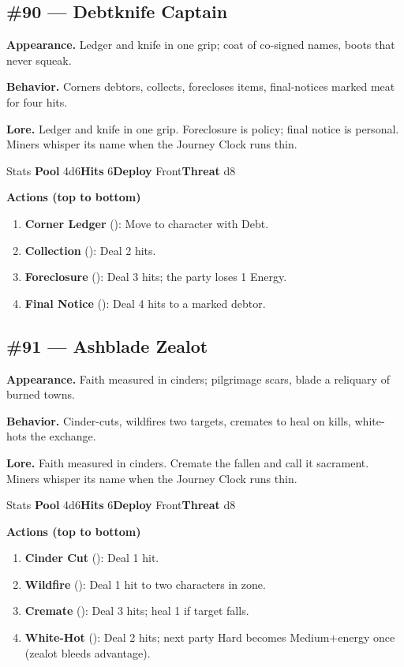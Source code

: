 \subsection*{\#90 --- Debtknife Captain}

\textbf{Appearance.} Ledger and knife in one grip; coat of co-signed names, boots that never squeak.

\textbf{Behavior.} Corners debtors, collects, forecloses items, final-notices marked meat for four hits.

\textbf{Lore.} Ledger and knife in one grip. Foreclosure is policy; final notice is personal. Miners whisper its name when the Journey Clock runs thin.

\begin{monsterentry}{Stats}
\textbf{Pool} 4d6\quad\textbf{Hits} 6\quad\textbf{Deploy} Front\quad\textbf{Threat} d8

\textbf{Actions (top to bottom)}
\begin{enumerate}\setlength{\itemsep}{0.15em}\setlength{\parskip}{0pt}
  \item \textbf{Corner Ledger} (\easy): Move to character with Debt.
  \item \textbf{Collection} (\medium): Deal 2 hits.
  \item \textbf{Foreclosure} (\hard): Deal 3 hits; the party loses 1 Energy.
  \item \textbf{Final Notice} (\hard): Deal 4 hits to a marked debtor.
\end{enumerate}
\end{monsterentry}

\subsection*{\#91 --- Ashblade Zealot}

\textbf{Appearance.} Faith measured in cinders; pilgrimage scars, blade a reliquary of burned towns.

\textbf{Behavior.} Cinder-cuts, wildfires two targets, cremates to heal on kills, white-hots the exchange.

\textbf{Lore.} Faith measured in cinders. Cremate the fallen and call it sacrament. Miners whisper its name when the Journey Clock runs thin.

\begin{monsterentry}{Stats}
\textbf{Pool} 4d6\quad\textbf{Hits} 6\quad\textbf{Deploy} Front\quad\textbf{Threat} d8

\textbf{Actions (top to bottom)}
\begin{enumerate}\setlength{\itemsep}{0.15em}\setlength{\parskip}{0pt}
  \item \textbf{Cinder Cut} (\easy): Deal 1 hit.
  \item \textbf{Wildfire} (\medium): Deal 1 hit to two characters in zone.
  \item \textbf{Cremate} (\hard): Deal 3 hits; heal 1 if target falls.
  \item \textbf{White-Hot} (\hard): Deal 2 hits; next party Hard becomes Medium+energy once (zealot bleeds advantage).
\end{enumerate}
\end{monsterentry}

